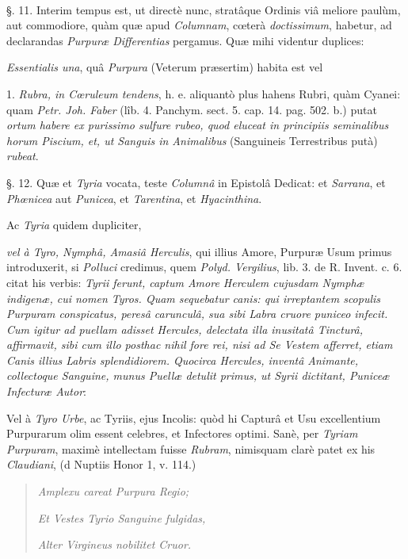 \documentclass[a4paper, 11pt, oneside, polutonikogreek, german]{article}
\begin{document}
\paragraph{}
§. 11. Interim tempus est, ut directè nunc, stratâque Ordinis viâ meliore paulùm, aut commodiore, quàm quæ apud \emph{Columnam}, cœterà \emph{doctissimum}, habetur, ad declarandas \emph{Purpuræ Differentias} pergamus. Quæ mihi videntur duplices:

\emph{Essentialis una}, quâ \emph{Purpura} (Veterum præsertim) habita est vel

1. \emph{Rubra, in Cœruleum tendens}, h. e. aliquantò plus hahens Rubri, quàm Cyanei: quam \emph{Petr. Joh. Faber} (lîb. 4. Panchym. sect. 5. cap. 14. pag. 502. b.) putat \emph{ortum habere ex purissimo sulfure rubeo, quod eluceat in principiis seminalibus horum Piscium, et, ut Sanguis in Animalibus} (Sanguineis Terrestribus putà) \emph{rubeat}.

§. 12. Quæ et \emph{Tyria} vocata, teste \emph{Columnâ} in Epistolâ Dedicat: et \emph{Sarrana}, et \emph{Phœnicea} aut \emph{Punicea}, et \emph{Tarentina}, et \emph{Hyacinthina}.

Ac \emph{Tyria} quidem dupliciter,

\emph{vel à Tyro, Nymphâ, Amasiâ Herculis}, qui illius Amore, Purpuræ Usum primus introduxerit, si \emph{Polluci} credimus, quem \emph{Polyd. Vergilius}, lib. 3. de R. Invent. c. 6. citat his verbis: \emph{Tyrii ferunt, captum Amore Herculem cujusdam Nymphæ indigenæ, cui nomen Tyros. Quam sequebatur canis: qui irreptantem scopulis Purpuram conspicatus, peresâ carunculâ, sua sibi Labra cruore puniceo infecit. Cum igitur ad puellam adisset Hercules, delectata illa inusitatâ Tincturâ, affirmavit, sibi cum illo posthac nihil fore rei, nisi ad Se Vestem afferret, etiam Canis illius Labris splendidiorem. Quocirca Hercules, inventâ Animante, collectoque Sanguine, munus Puellæ detulit primus, ut Syrii dictitant, Puniceæ Infecturæ Autor}:

Vel à \emph{Tyro Urbe}, ac Tyriis, ejus Incolis: quòd hi Capturâ et Usu excellentium Purpurarum olim essent celebres, et Infectores optimi. Sanè, per \emph{Tyriam Purpuram}, maximè intellectam fuisse \emph{Rubram}, nimisquam clarè patet ex his \emph{Claudiani}, (d Nuptiis Honor 1, v. 114.)
\begin{quotation}
\emph{Amplexu careat Purpura Regio;}

\emph{Et Vestes Tyrio Sanguine fulgidas,}

\emph{Alter Virgineus nobilitet Cruor.}
\end{quotation}
\end{document}
